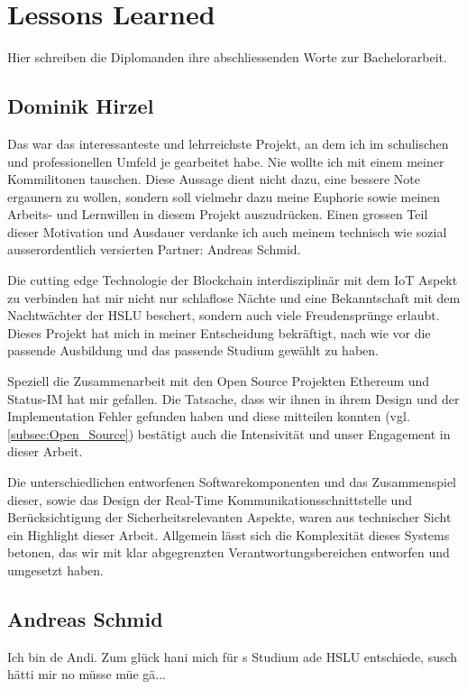 \section{Lessons Learned}
\label{sec:Lessons_Learned}
Hier schreiben die Diplomanden ihre abschliessenden Worte zur Bachelorarbeit.

\subsection{Dominik Hirzel}
Das war das interessanteste und lehrreichste Projekt, an dem ich im schulischen und professionellen Umfeld je gearbeitet habe. Nie wollte ich mit einem meiner Kommilitonen tauschen. Diese Aussage dient nicht dazu, eine bessere Note ergaunern zu wollen, sondern soll vielmehr dazu meine Euphorie sowie meinen Arbeits- und Lernwillen in diesem Projekt auszudrücken. Einen grossen Teil dieser Motivation und Ausdauer verdanke ich auch meinem technisch wie sozial ausserordentlich versierten Partner: Andreas Schmid.

Die cutting edge Technologie der Blockchain interdisziplinär mit dem IoT Aspekt zu verbinden hat mir nicht nur schlaflose Nächte und eine Bekanntschaft mit dem Nachtwächter der HSLU beschert, sondern auch viele Freudensprünge erlaubt. Dieses Projekt hat mich in meiner Entscheidung bekräftigt, nach wie vor die passende Ausbildung und das passende Studium gewählt zu haben.

Speziell die Zusammenarbeit mit den Open Source Projekten Ethereum und Status-IM hat mir gefallen. Die Tatsache, dass wir ihnen in ihrem Design und der Implementation Fehler gefunden haben und diese mitteilen konnten (vgl. \ref{subsec:Open_Source}) bestätigt auch die Intensivität und unser Engagement in dieser Arbeit.

Die unterschiedlichen entworfenen Softwarekomponenten und das Zusammenspiel dieser, sowie das Design der Real-Time Kommunikationsschnittstelle und Berücksichtigung der Sicherheitsrelevanten Aspekte, waren aus technischer Sicht ein Highlight dieser Arbeit. Allgemein lässt sich die Komplexität dieses Systems betonen, das wir mit klar abgegrenzten Verantwortungsbereichen entworfen und umgesetzt haben.

\subsection{Andreas Schmid}
Ich bin de Andi. Zum glück hani mich für s Studium ade HSLU entschiede, susch hätti mir no müsse müe gä...
